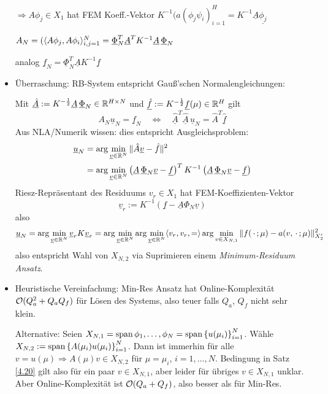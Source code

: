 \begin{bem}
\begin{itemize}
		$\Rightarrow A\phi_j \in X_1$ hat FEM Koeff.-Vektor $K^{-1} (a(\phi_j \psi_i)_{i=1}^H = K^{-1} \underline{A} \underline{\phi_j}$
		
		$A_N= (\dotp{A\phi_j}{A\phi_i}_{i,j=1}^N = \underline{\Phi}_N^T \underline{A}^T K^{-1} \underline{A} \, \underline{\Phi}_N$
		
		analog $\underline{f}_N = \underline{\Phi}_N^T \underline{A} K^{-1} \underline{f}$
		\item Überraschung: RB-System entspricht Gauß'schen Normalengleichungen:

			Mit $\underline{\hat A} := K^{-\frac{1}{2}} \underline{A} \, \underline{\Phi}_N \in \mathbb{R}^{H \times N}$ und $\underline{\hat f} := K^{-\frac{1}{2}} \underline{f}(\mu) \in \mathbb{R}^H$ gilt
			\[
				A_N \underline{u}_N = \underline{f}_N \quad \Leftrightarrow \quad \underline{\hat A}^T \underline{\hat A} \, \underline{u}_N = \hat A^T \underline{\hat f}
			\]
			Aus NLA/Numerik wissen: dies entspricht Ausgleichsproblem:
			\begin{align*}
				\underline{u}_N &= \arg \min_{\underline{v} \in \mathbb{R}^N} \|\hat A \underline{v} - \hat f\|^2 \\
				&= \arg \min_{\underline{v} \in \mathbb{R}^N} \left( \underline{A} \, \underline{\Phi}_N \underline{v} - \underline{f} \right)^T K^{-1} \left( \underline{A} \, \underline{\Phi}_N \underline{v} - \underline{f} \right)
			\end{align*}
			Riesz-Repräsentant des Residuums $v_r \in X_1$ hat FEM-Koeffizienten-Vektor
			\[
				\underline{v}_r := K^{-1} \left( \underline{f} - \underline{A} \Phi_N \underline{v} \right)
			\]
			also
			\[
				\underline{u}_N = \arg\min_{\underline{v} \in \mathbb{R}^N} \underline{v}_r K \underline{v}_r = \arg\min_{\underline{v} \in \mathbb{R}^N} \arg\min_{\underline{v} \in \mathbb{R}^N} \langle v_r,v_r, = \rangle \arg\min_{v \in X_{N,1}} \|f(\,\cdot\,;\mu)-a(v,\,\cdot\,;\mu)\|_{X_2'}^2
			\]
			also entspricht Wahl von $X_{N,2}$ via Suprimieren einem \emph{Minimum-Residuum Ansatz}.
		\item Heuristische Vereinfachung: Min-Res Ansatz hat Online-Komplexität $\mathcal O(Q_a^2 + Q_a Q_f)$ für Lösen des Systems, also teuer falls $Q_a$, $Q_f$ nicht sehr klein.

			Alternative: Seien $X_{N,1} = \spn{\phi_1,\ldots,\phi_N} = \spn{\set{u(\mu_i)}_{i=1}^N}$. Wähle $X_{N,2} := \operatorname{span}\left\{A(\mu_i) u(\mu_i)\right\}_{i=1}^N$. Dann ist immerhin für alle $v = u(\mu) \Rightarrow A(\mu) v \in X_{N,2}$ für $\mu = \mu_i$, $i = 1,\ldots,N$. Bedingung in Satz \ref{4.20} gilt also für ein paar $v \in X_{N,1}$, aber leider für übriges $v \in X_{N,1}$ unklar. Aber Online-Komplexität ist $\mathcal O(Q_a+Q_f)$, also besser als für Min-Res.
		\end{itemize}
\end{bem}

